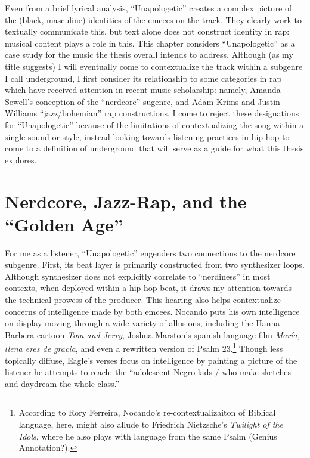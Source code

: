 Even from a brief lyrical analysis, ``Unapologetic'' creates a complex picture of the (black, masculine) identities
of the emcees on the track. They clearly work to textually communicate this, but text alone does not construct identity
in rap: musical content plays a role in this. This chapter considers ``Unapologetic'' as a case study for the music the
thesis overall intends to address. Although (as my title suggests) I will eventually come to contextualize the track
within a subgenre I call underground, I first consider its relationship to some categories in rap which have received
attention in recent music scholarship: namely, Amanda Sewell's conception of the ``nerdcore'' sugenre, and 
Adam Krims and Justin Williams ``jazz/bohemian'' rap constructions. I come to reject these designations for ``Unapologetic''
because of the limitations of contextualizing the song within a single sound or style, instead looking towards listening
practices in hip-hop to come to a definition of underground that will serve as a guide for what this thesis explores.


\section{Nerdcore, Jazz-Rap, and the ``Golden Age''} \label{nerdcorejazzrapgoldenage}

For me as a listener, ``Unapologetic'' engenders two connections to the nerdcore subgenre. First, its beat 
layer is primarily constructed from two synthesizer loops. Although synthesizer does not explicitly
correlate to ``nerdiness'' in most contexts, when deployed within a hip-hop beat, it draws my attention
towards the technical prowess of the producer. This hearing also helps contextualize concerns of intelligence
made by both emcees. Nocando puts his own intelligence on display moving through a wide variety of allusions, 
including the Hanna-Barbera cartoon \textit{Tom and Jerry}, Joshua Marston's spanish-language film 
\textit{María, llena eres de gracia}, and even a rewritten version of Psalm 23.\footnote{
    According to Rory Ferreira, Nocando's re-contextualizaiton of Biblical language, here, might also 
    allude to Friedrich Nietzsche's \textit{Twilight of the Idols}, where he also plays with language
    from the same Psalm (Genius Annotation?).} 
Though less topically diffuse, Eagle's verses focus on intelligence by painting a picture of the listener he
attempts to reach: the ``adolescent Negro lads / who make sketches and daydream the whole class.''

